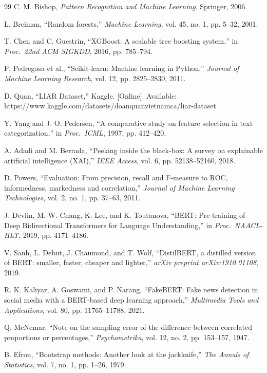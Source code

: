 \documentclass[conference]{IEEEtran}
\begin{document}
\begin{thebibliography}{99}
 C. M. Bishop, \emph{Pattern Recognition and Machine Learning}. Springer, 2006.

 L. Breiman, ``Random forests,'' \emph{Machine Learning}, vol. 45, no. 1, pp. 5--32, 2001.

 T. Chen and C. Guestrin, ``XGBoost: A scalable tree boosting system,'' in \emph{Proc.\ 22nd ACM SIGKDD}, 2016, pp. 785--794.

 F. Pedregosa et al., ``Scikit-learn: Machine learning in Python,'' \emph{Journal of Machine Learning Research}, vol. 12, pp. 2825--2830, 2011.

 D. Quan, ``LIAR Dataset,'' Kaggle. [Online]. Available: https://www.kaggle.com/datasets/doanquanvietnamca/liar-dataset

 Y. Yang and J. O. Pedersen, ``A comparative study on feature selection in text categorization,'' in \emph{Proc.\ ICML}, 1997, pp. 412--420.

 A. Adadi and M. Berrada, ``Peeking inside the black-box: A survey on explainable artificial intelligence (XAI),'' \emph{IEEE Access}, vol. 6, pp. 52138--52160, 2018.

 D. Powers, ``Evaluation: From precision, recall and F-measure to ROC, informedness, markedness and correlation,'' \emph{Journal of Machine Learning Technologies}, vol. 2, no. 1, pp. 37--63, 2011.

 J. Devlin, M.-W. Chang, K. Lee, and K. Toutanova, ``BERT: Pre-training of Deep Bidirectional Transformers for Language Understanding,'' in \emph{Proc.\ NAACL-HLT}, 2019, pp. 4171--4186.

 V. Sanh, L. Debut, J. Chaumond, and T. Wolf, ``DistilBERT, a distilled version of BERT: smaller, faster, cheaper and lighter,'' \emph{arXiv preprint arXiv:1910.01108}, 2019.

 R. K. Kaliyar, A. Goswami, and P. Narang, ``FakeBERT: Fake news detection in social media with a BERT-based deep learning approach,'' \emph{Multimedia Tools and Applications}, vol. 80, pp. 11765--11788, 2021.

 Q. McNemar, ``Note on the sampling error of the difference between correlated proportions or percentages,'' \emph{Psychometrika}, vol. 12, no. 2, pp. 153--157, 1947.

 B. Efron, ``Bootstrap methods: Another look at the jackknife,'' \emph{The Annals of Statistics}, vol. 7, no. 1, pp. 1--26, 1979.

\end{thebibliography}
\end{document}
